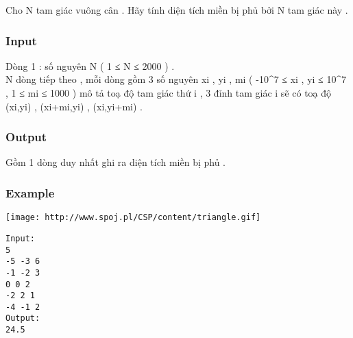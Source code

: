 



   Cho N tam giác vuông cân . Hãy tính diện tích miền bị phủ bởi N tam giác này .  

\subsubsection{   Input  }

   Dòng 1 : số nguyên N ( 1 ≤ N ≤ 2000 ) .   
\\   N dòng tiếp theo , mỗi dòng gồm 3 số nguyên xi , yi , mi (  -10^7 ≤ xi , yi ≤ 10^7 , 1 ≤ mi  ≤ 1000 ) mô tả toạ độ tam giác thứ i , 3 đỉnh tam giác i sẽ có toạ độ (xi,yi) , (xi+mi,yi) , (xi,yi+mi) .  

\subsubsection{   Output  }

   Gồm 1 dòng duy nhất ghi ra diện tích miền bị phủ .  

\subsubsection{   Example  }
\texttt{[image: http://www.spoj.pl/CSP/content/triangle.gif]}
\begin{verbatim}
Input:
5
-5 -3 6
-1 -2 3
0 0 2
-2 2 1
-4 -1 2
Output:
24.5
\end{verbatim}
